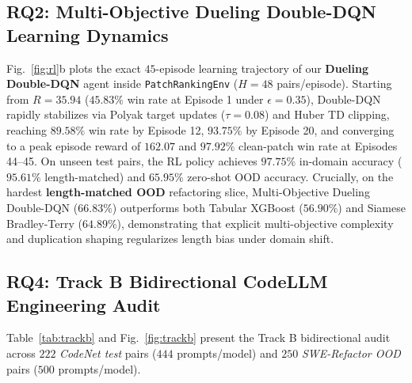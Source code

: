 \documentclass[conference]{IEEEtran}
\begin{document}
\subsection{RQ2: Multi-Objective Dueling Double-DQN Learning Dynamics}
Fig.~\ref{fig:rl}b plots the exact $45$-episode learning trajectory of our \textbf{Dueling Double-DQN} agent inside \texttt{PatchRankingEnv} ($H=48$ pairs/episode). Starting from $R=35.94$ ($45.83\%$ win rate at Episode 1 under $\epsilon=0.35$), Double-DQN rapidly stabilizes via Polyak target updates ($\tau=0.08$) and Huber TD clipping, reaching $89.58\%$ win rate by Episode 12, $93.75\%$ by Episode 20, and converging to a peak episode reward of \textbf{$162.07$} and \textbf{$97.92\%$} clean-patch win rate at Episodes 44--45. On unseen test pairs, the RL policy achieves $97.75\%$ in-domain accuracy ($95.61\%$ length-matched) and $65.95\%$ zero-shot OOD accuracy. Crucially, on the hardest \textbf{length-matched OOD} refactoring slice, Multi-Objective Dueling Double-DQN ($66.83\%$) outperforms both Tabular XGBoost ($56.90\%$) and Siamese Bradley-Terry ($64.89\%$), demonstrating that explicit multi-objective complexity and duplication shaping regularizes length bias under domain shift.

\subsection{RQ4: Track B Bidirectional CodeLLM Engineering Audit}
Table~\ref{tab:trackb} and Fig.~\ref{fig:trackb} present the Track B bidirectional audit across $222$ \textit{CodeNet test} pairs ($444$ prompts/model) and $250$ \textit{SWE-Refactor OOD} pairs ($500$ prompts/model).
\end{document}
